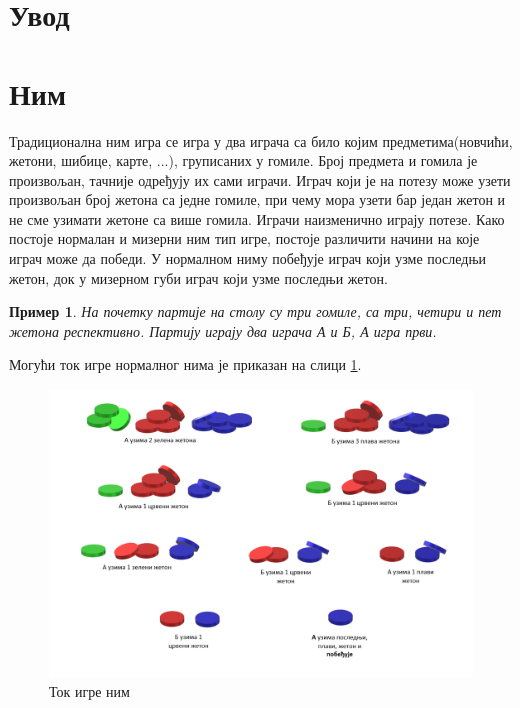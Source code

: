 \documentclass[a4paper]{article}
\newtheorem{example}{Пример}
\begin{document}

\newpage
{}
\tableofcontents

\newpage
{}
\section{Увод}
\label{sec:uvod}

\section{Ним}
\label{sec:nim}

Традиционална ним игра се игра у два играча са било којим предметима(новчићи, жетони, шибице, карте, ...), груписаних у гомиле. Број предмета и гомила је произвољан, тачније одређују их сами играчи. Играч који је на потезу може узети произвољан број жетона са једне гомиле, при чему мора узети бар један жетон и не сме узимати жетоне са више гомила. Играчи наизменично играју потезе. Како постоје нормалан и мизерни ним тип игре, постоје различити начини на које играч може да победи. У нормалном ниму побеђује играч који узме последњи жетон, док у мизерном губи играч који узме последњи жетон.

\begin{example}
На почетку партије на столу су три гомиле, са три, четири и пет жетона респективно. Партију играју два играча \textit{А} и \textit{Б}, \textit{А} игра први. 
\end{example}

Могући ток игре нормалног нима је приказан на слици \ref{fig:nimPrimer}.

\begin{figure}[H]
	\caption{Ток игре ним}
	\label{fig:nimPrimer}
	\begin{center}
		\includegraphics[width=\textwidth]{NimPrimer.png}
	\end{center}
\end{figure}
\end{document}

